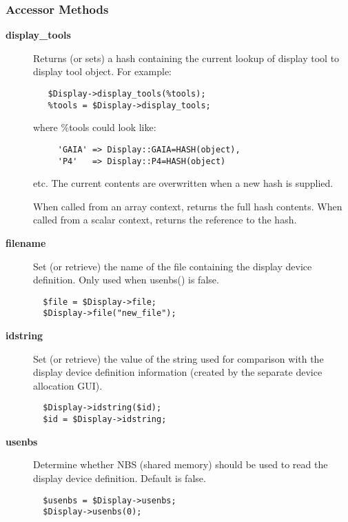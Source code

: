 \subsubsection*{Accessor Methods\label{ORAC::Display_Accessor_Methods}}
\begin{description}

\item[\textbf{display\_tools}] \mbox{}

Returns (or sets) a hash containing the current lookup of display tool
to display tool object. For example:

\begin{verbatim}
   $Display->display_tools(%tools);
   %tools = $Display->display_tools;
\end{verbatim}


where \%tools could look like:

\begin{verbatim}
     'GAIA' => Display::GAIA=HASH(object),
     'P4'   => Display::P4=HASH(object)
\end{verbatim}


etc. The current contents are overwritten when a new hash is supplied.



When called from an array context, returns the full hash contents.
When called from a scalar context, returns the reference to the hash.


\item[\textbf{filename}] \mbox{}

Set (or retrieve) the name of the file containing the display device
definition. Only used when usenbs() is false.

\begin{verbatim}
  $file = $Display->file;
  $Display->file("new_file");
\end{verbatim}

\item[\textbf{idstring}] \mbox{}

Set (or retrieve) the value of the string used for comparison
with the display device definition information (created by the
separate device allocation GUI).

\begin{verbatim}
  $Display->idstring($id);
  $id = $Display->idstring;
\end{verbatim}

\item[\textbf{usenbs}] \mbox{}

Determine whether NBS (shared memory) should be used to read the
display device definition. Default is false.

\begin{verbatim}
  $usenbs = $Display->usenbs;
  $Display->usenbs(0);
\end{verbatim}
\end{description}

